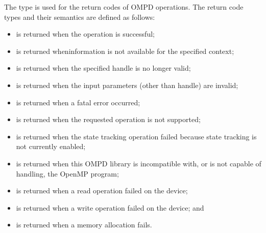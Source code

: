 \descr
The  type is used for the return codes of OMPD operations. 
The return code types and their semantics are defined as follows:

\begin{itemize}
\label{ompd:ompd_rc_ok}
\item {} is returned when the operation is successful;

\label{ompd:ompd_rc_unavailable}
\item {} is returned wheninformation is not 
      available for the specified context;

\label{ompd:ompd_rc_stale_handle}
\item {} is returned when the specified handle 
      is no longer valid;

\label{ompd:ompd_rc_bad_input}
\item {} is returned when the input parameters 
      (other than handle) are invalid;

\label{ompd:ompd_rc_error}
\item {} is returned when a fatal error occurred;

\label{ompd:ompd_rc_unsupported}
\item {} is returned when the requested 
      operation is not supported;

\label{ompd:ompd_rc_needs_state_tracking}
\item {} is returned when the state 
      tracking operation failed because state tracking is not currently enabled;

\label{ompd:ompd_rc_incompatible}
\item {} is returned when this OMPD library 
      is incompatible with, or is not capable of handling, the OpenMP program;

\label{ompd:ompd_rc_device_read_error}
\item {} is returned when a read operation 
      failed on the device;

\label{ompd:ompd_rc_device_write_error}
\item {} is returned when a write operation 
      failed on the device; and

\label{ompd:ompd_rc_nomem}
\item {} is returned when a memory allocation fails.
\end{itemize}



